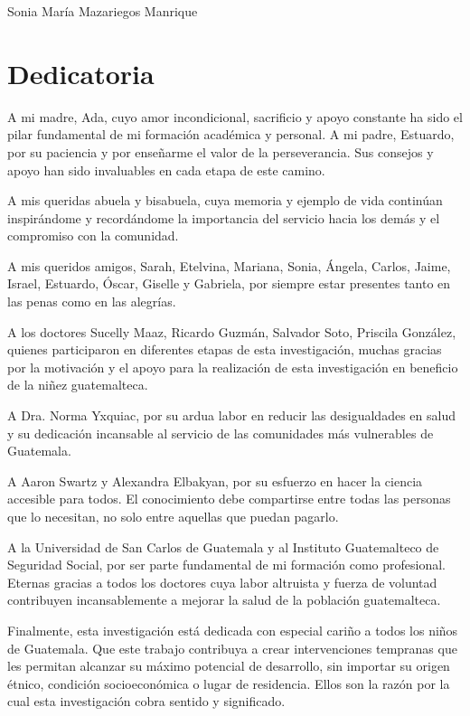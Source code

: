 \documentclass[11pt,letterpaper]{report}
\begin{document}
\vspace{1cm}

\begin{flushright}
Sonia María Mazariegos Manrique
\end{flushright}

\chapter*{Dedicatoria}
A mi madre, Ada, cuyo amor incondicional, sacrificio y  apoyo constante
ha sido el pilar fundamental de mi formación académica y personal. A mi padre,
Estuardo, por su paciencia y por enseñarme el valor de la perseverancia. Sus
consejos y apoyo han sido invaluables en cada etapa de este camino.

A mis queridas abuela y bisabuela, cuya memoria y ejemplo de vida continúan
inspirándome y recordándome la importancia del servicio hacia los demás y el
compromiso con la comunidad.

A mis queridos amigos, Sarah, Etelvina, Mariana, Sonia, Ángela, Carlos, Jaime,
Israel, Estuardo, Óscar, Giselle y Gabriela, por siempre estar presentes tanto
en las penas como en las alegrías.

A los doctores Sucelly Maaz, Ricardo Guzmán, Salvador Soto, Priscila González,
quienes participaron en diferentes etapas de esta investigación, muchas gracias
por la motivación y el apoyo para la realización de esta investigación en
beneficio de la niñez guatemalteca.

A Dra. Norma Yxquiac, por su ardua labor en reducir las desigualdades en salud y
su dedicación incansable al servicio de las comunidades más vulnerables de
Guatemala.

A Aaron Swartz y Alexandra Elbakyan, por su esfuerzo en hacer la ciencia
accesible para todos. El conocimiento debe compartirse entre todas 
las personas que lo necesitan, no solo entre aquellas que puedan pagarlo.

A la Universidad de San Carlos de Guatemala y al Instituto Guatemalteco de 
Seguridad Social, por ser parte fundamental de mi formación como profesional. 
Eternas gracias a todos los doctores cuya labor altruista y fuerza de voluntad 
contribuyen incansablemente a mejorar la salud de la población guatemalteca.

Finalmente, esta investigación está dedicada con especial cariño a todos los 
niños de Guatemala. Que este trabajo contribuya a crear intervenciones tempranas 
que les permitan alcanzar su máximo potencial de desarrollo, sin importar su 
origen étnico, condición socioeconómica o lugar de residencia. Ellos son la 
razón por la cual esta investigación cobra sentido y significado.
\end{document}
